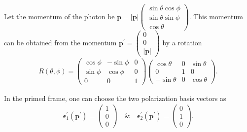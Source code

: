 Let the momentum of the photon be $\mathbf{p} = |\mathbf{p}|
\begin{pmatrix}
    \sin \theta \cos \phi \\
    \sin \theta \sin \phi \\
    \cos \theta
\end{pmatrix}$. This momentum can be obtained from the momentum $\mathbf{p}^\prime =
\begin{pmatrix}
    0 \\
    0 \\
    |\mathbf{p}|
\end{pmatrix}$ by a rotation
\begin{align}
    R(\theta, \phi) =
    \begin{pmatrix}
        \cos \phi & -\sin \phi & 0 \\
        \sin \phi & \cos \phi & 0 \\
        0 & 0 & 1
    \end{pmatrix}
    \begin{pmatrix}
        \cos \theta & 0 & \sin \theta \\
        0 & 1 & 0 \\
        -\sin \theta & 0 & \cos \theta
    \end{pmatrix}.
\end{align}

In the primed frame, one can choose the two polarization basis vectors as
\begin{align}
    \boldsymbol{\epsilon}^\prime_1(\mathbf{p}^\prime) =
    \begin{pmatrix}
        1 \\
        0 \\
        0
    \end{pmatrix} \quad \& \quad \boldsymbol{\epsilon}^\prime_2(\mathbf{p}^\prime) =
    \begin{pmatrix}
        0 \\
        1 \\
        0
    \end{pmatrix}.
\end{align}

